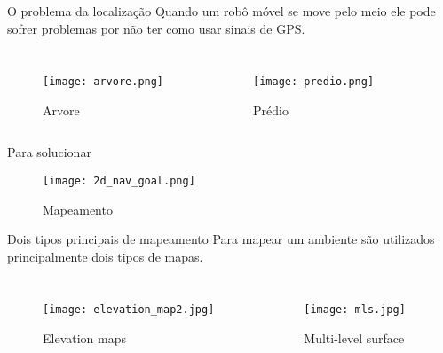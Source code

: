 \begin{frame}[t]{O problema da localização} 
    \transdissolve[duration=0.5]
    Quando um robô móvel se move pelo meio ele pode sofrer problemas por não ter como usar sinais de GPS.
        \begin{columns}[t]
            \begin{figure}
                \texttt{[image: arvore.png]}
                \caption{Arvore \cite{arvore:online}}
            \end{figure}
            \begin{figure}
                \texttt{[image: predio.png]}
                \caption{Prédio \cite{predio}}
            \end{figure}

        \end{columns}
\end{frame}

\begin{frame}[t]{Para solucionar} 
    \transdissolve[duration=0.5]
    \begin{center}
        \begin{figure}
            \texttt{[image: 2d\_nav\_goal.png]}
            \caption{Mapeamento \cite{Turtlebot}}
        \end{figure}
    \end{center}

\end{frame}

\begin{frame}[t]{Dois tipos principais de mapeamento} 
    \transdissolve[duration=0.5]
    Para mapear um ambiente são utilizados principalmente dois tipos de mapas.
    \begin{columns}[t]
        \begin{figure}
            \texttt{[image: elevation\_map2.jpg]}
            \caption{Elevation maps \cite{article}}
        \end{figure}
        \begin{figure}
            \texttt{[image: mls.jpg]}
            \caption{Multi-level surface \cite{article}}
        \end{figure}
    \end{columns}

\end{frame}

